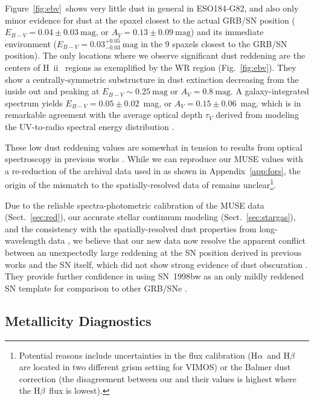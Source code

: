 \documentclass[traditabstract, referee]{aa}
\newcommand{\hb}{H$\beta$}
\newcommand{\ha}{H$\alpha$}
\newcommand{\hii}{\mbox{H~{\sc ii}}}
\begin{document}
Figure~\ref{fig:ebv}~shows very little dust in general in ESO184-G82, and also only minor evidence for dust at the spaxel closest to the actual GRB/SN position ($E_{B-V} = 0.04\pm0.03~\mathrm{mag}$, or $A_V = 0.13\pm0.09~\mathrm{mag}$) and its immediate environment ($E_{B-V} = 0.03_{-0.03}^{+0.05}~\mathrm{mag}$ in the 9 spaxels closest to the GRB/SN position). The only locations where we observe significant dust reddening are the centers of \hii~ regions as exemplified by the WR region (Fig.~\ref{fig:ebv}). They show a centrally-symmetric substructure in dust extinction decreasing from the inside out and peaking at $E_{B-V} \sim 0.25~\mathrm{mag}$ or $A_V = 0.8~\mathrm{mag}$. A galaxy-integrated spectrum yields $E_{B-V} = 0.05\pm0.02$~mag, or $A_V=0.15\pm0.06$~mag, which is in remarkable agreement with the average optical depth $\tau_V$ derived from modeling the UV-to-radio spectral energy distribution \citep{2014A&A...562A..70M}.

These low dust reddening values are somewhat in tension to results from optical spectroscopy in previous works \citep{2006A&A...454..103H, 2008A&A...490...45C}. While we can reproduce our MUSE values with a re-reduction of the archival data used in \citet{2006A&A...454..103H} as shown in Appendix~\ref{app:fors}, the origin of the mismatch to the spatially-resolved data of \citet{2008A&A...490...45C} remains unclear\footnote{Potential reasons include uncertainties in the flux calibration (\ha~and \hb~ are located in two different grism setting for VIMOS) or the Balmer dust correction (the disagreement between our and their values is highest where the \hb~flux is lowest).}.

Due to the reliable spectra-photometric calibration of the MUSE data (Sect.~\ref{sec:red}), our accurate stellar continuum modeling (Sect.~\ref{sec:stargas}), and the consistency with the {spatially-resolved dust properties from long-wavelength data \citep{2014A&A...562A..70M}}, we believe that our new data now resolve the apparent conflict between an unexpectedly large reddening at the SN position derived in previous {works} and the SN itself, which did not show strong evidence of dust obscuration \citep[e.g.][]{1998Natur.395..672I, 2001ApJ...555..900P}. They provide further confidence in using SN~1998bw as an only mildly reddened SN template for comparison to other GRB/SNe \citep[e.g.][and references therein]{2004ApJ...609..952Z, 2014A&A...566A.102S, 2016arXiv160606791K}.

\subsection{Metallicity Diagnostics}
\end{document}
